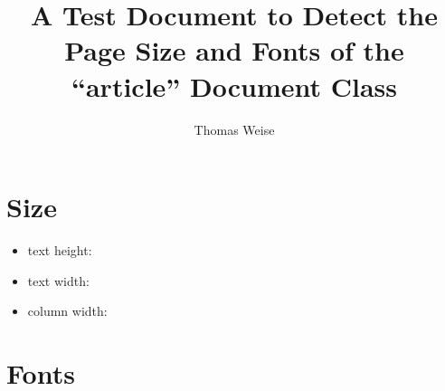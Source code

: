 \documentclass{article}%
\begin{document}
%
%
\title{A Test Document to Detect the Page Size and Fonts of the ``article'' Document Class}%
\author{Thomas Weise}%
%
\maketitle%
%
%
\section{Size}%
%
\begin{itemize}%
\item text height: \the\textheight%
\item text width: \the\textwidth%
\item column width: \the\columnwidth%
\end{itemize}%
%
\section{Fonts}%
%
\end{document}
